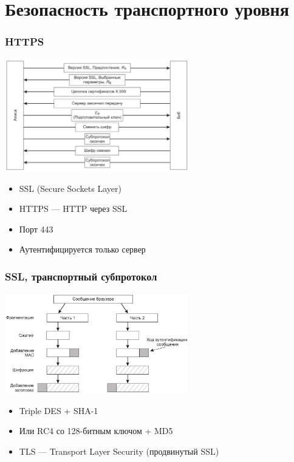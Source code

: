 \documentclass{../../slides-style}
\begin{document}
    \section{Безопасность транспортного уровня}

    \begin{frame}
        \frametitle{HTTPS}
        \begin{center}
            \includegraphics[width=0.6\textwidth]{ssl.png}
        \end{center}
        \begin{itemize}
            \item SSL (Secure Sockets Layer)
            \item HTTPS --- HTTP через SSL
            \item Порт 443
            \item Аутентифицируется только сервер
        \end{itemize}
    \end{frame}

    \begin{frame}
        \frametitle{SSL, транспортный субпротокол}
        \begin{center}
            \includegraphics[width=0.6\textwidth]{sslCommunication.png}
        \end{center}
        \begin{itemize}
            \item Triple DES + SHA-1
            \item Или RC4 со 128-битным ключом + MD5
            \item TLS --- Transport Layer Security (продвинутый SSL)
        \end{itemize}
    \end{frame}
\end{document}

